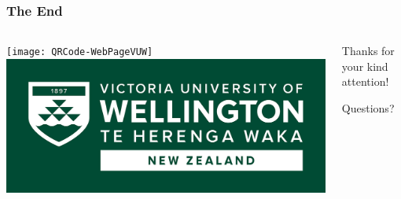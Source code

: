\documentclass[table,aspectratio=169]{beamer}
\begin{document}
\begin{frame}[standout]
	\frametitle{The End}
	\begin{columns}
		\begin{column}{.4\linewidth}
			\centering
			\texttt{[image: QRCode-WebPageVUW]}\\	\includegraphics[width=\linewidth]{"Logo Offshore Reversed Landscape RGB"}
		\end{column}
		\begin{column}{.6\linewidth}
			Thanks for your kind attention!
			
			Questions?
		\end{column}
	\end{columns}
\end{frame}
\end{document}
